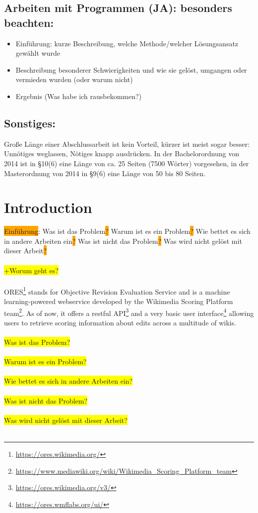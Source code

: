 \documentclass[12pt,a4paper]{article}
\begin{document}
\subsection*{Arbeiten mit Programmen (JA): besonders beachten:}
\begin{itemize}
\item Einführung: kurze Beschreibung, welche Methode/welcher Lösungsansatz gewählt wurde
\item Beschreibung besonderer Schwierigkeiten und wie sie gelöst, umgangen oder vermieden wurden (oder warum nicht)
\item Ergebnis (Was habe ich rausbekommen?)
\end{itemize}
\subsection*{Sonstiges:}
Große Länge einer Abschlussarbeit ist kein Vorteil, kürzer ist meist sogar besser: Unnötiges weglassen, Nötiges knapp ausdrücken. In der Bachelorordnung von 2014 ist in §10(6) eine Länge von ca. 25 Seiten (7500 Wörter) vorgesehen, in der Masterordnung von 2014 in §9(6) eine Länge von 50 bis 80 Seiten.
%
%
%
\section{Introduction}
\colorbox{orange}{Einführung}: Was ist das Problem\colorbox{orange}{?} Warum ist es ein Problem\colorbox{orange}{?} Wie bettet es sich in andere Arbeiten ein\colorbox{orange}{?} Was ist nicht das Problem\colorbox{orange}{?} Was wird nicht gelöst mit dieser Arbeit\colorbox{orange}{?}
\\
\\
\colorbox{yellow}{+Worum geht es?}
\\
\\
ORES\footnote{\url{https://ores.wikimedia.org/}} stands for Objective Revision Evaluation Service and is a machine learning-powered webservice developed by the Wikimedia Scoring Platform team\footnote{\url{https://www.mediawiki.org/wiki/Wikimedia_Scoring_Platform_team}}. As of now, it offers a restful API\footnote{\url{https://ores.wikimedia.org/v3/}} and a very basic user interface\footnote{\url{https://ores.wmflabs.org/ui/}} allowing users to retrieve scoring information about edits across a multitude of wikis.
\\
\\
\colorbox{yellow}{Was ist das Problem?}
\\
\\
\colorbox{yellow}{Warum ist es ein Problem?}
\\
\\
\colorbox{yellow}{Wie bettet es sich in andere Arbeiten ein?}
\\
\\
\colorbox{yellow}{Was ist nicht das Problem?}
\\
\\
\colorbox{yellow}{Was wird nicht gelöst mit dieser Arbeit?}
\\
\\
%
%
%
\end{document}
